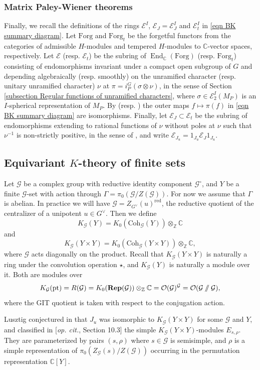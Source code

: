\documentclass[10pt]{article}
\DeclareMathOperator{\End}{End}
\newcommand{\Rep}{\mathbf{Rep}}
\newcommand{\Coh}{\mathrm{Coh}}
\newcommand{\git}{\mathbin{
  \mathchoice{/\mkern-6mu/}%
    {/\mkern-6mu/}%
    {/\mkern-5mu/}%
    {/\mkern-5mu/}}}%
\newcommand{\pt}{\mathrm{pt}}
\newcommand{\Ee}{\mathcal{E}}
\newcommand{\Z}{\mathbb{Z}}
\newcommand{\C}{\mathbb{C}}
\newcommand{\Oo}{\mathcal{O}}
\theoremstyle{definition}
\theoremstyle{remark}
\newcommand{\Zur}{Z_{G^\vee}(u)^{\mathrm{red}}}
\newcommand{\Zz}{\mathcal{G}}
\begin{document}
\subsubsection{Matrix Paley-Wiener theorems}
Finally, we recall the definitions of the rings $\Ee^I$, $\Ee_J=\Ee_J^I$ and $\Ee_t^I$ in \eqref{eqn BK summary diagram}. 
Let $\mathrm{Forg}$ and $\mathrm{Forg}_t$ be the forgetful functors from the categories of admissible
$H$-modules and tempered $H$-modules to $\C$-vector spaces, respectively. Let $\Ee$ (resp. $\Ee_t$) be the subring of 
$\End_\C(\mathrm{Forg})$ (resp. $\mathrm{Forg}_t$) consisting of endomorphisms invariant under a compact open
subgroup of $G$ and depending algebraically (resp.
smoothly) on the unramified character (resp. unitary unramified character) $\nu$ at 
$\pi=i_P^G(\sigma\otimes\nu)$, in the sense of Section \ref{subsection Regular functions of unramified characters}, where $\sigma\in\Ee_2^I(M_P)$ is an $I$-spherical representation of $M_P$. By \cite[Thm. 25]{Bernstein}  (resp. \cite[Section 9]{SchZnk}) the outer maps $f\mapsto\pi(f)$ in \eqref{eqn BK summary diagram} are isomorphisms.
Finally, let $\Ee_J\subset\Ee_t$ be the subring of endomorphisms 
extending to rational functions of $\nu$ without poles at $\nu$ such that $\nu^{-1}$ is non-strictly 
positive, in the sense of \cite[Section 1.7]{BK}, and write $\Ee_{J_u}= 1_{J_u}\Ee_{J} 1_{J_u}$.
%
\subsection{Equivariant $K$-theory of finite sets}
\label{subsection Equivariant K-theory of finite sets}
%
Let $\Zz$ be a complex group with reductive identity component $\Zz^\circ$, and $Y$ be a finite $\Zz$-set
with action through $\Gamma=\pi_0(\Zz/Z(\Zz))$. For now we assume that $\Gamma$ is
abelian. In practice we will have $\Zz=\Zur$, the reductive quotient of the centralizer of a unipotent 
$u\in G^\vee$. Then we define
%
\[
K_\Zz(Y)=K_0(\Coh_\Zz(Y))\otimes_\Z\C
\]
%
and
%
\[
K_\Zz(Y\times Y)=K_0(\Coh_\Zz(Y\times Y))\otimes_\Z\C,
\]
%
where $\Zz$ acts diagonally on the product. Recall that $K_\Zz(Y\times Y)$ is naturally a 
ring under the convolution operation $\star$, and $K_\Zz(Y)$ is naturally a module over it. Both
are modules over
%
\[
K_\Zz(\pt)=R(\Zz)=K_0(\Rep(\Zz))\otimes_\Z\C=\Oo(\Zz)^\Zz=\Oo(\Zz\git\Zz),
\]
%
where the GIT quotient is taken with respect to the conjugation action.

Lusztig conjectured in \cite{cellsIV} that $J_u$ was isomorphic to $K_\Zz(Y\times Y)$ for 
some $\Zz$ and $Y$, and classified in [\textit{op. cit.}, Section 10.3] the simple 
$K_\Zz(Y\times Y)$-modules $E_{s,\rho}$. They are parameterized by pairs $(s,\rho)$ where $s\in \Zz$ is 
semisimple, and $\rho$ is a simple representation of $\pi_0(Z_{\Zz}(s)/Z(\Zz))$ occurring in the 
permutation representation $\C[Y]$. 
\end{document}
